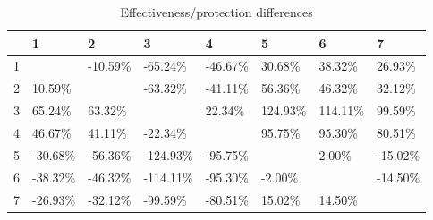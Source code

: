 \begin{table}[ht]
\centering
\begin{tabular}{rlllllll}
  \hline
 & 1 & 2 & 3 & 4 & 5 & 6 & 7 \\ 
  \hline
1 &  & -10.59\% & -65.24\% & -46.67\% & 30.68\% & 38.32\% & 26.93\% \\ 
  2 & 10.59\% &  & -63.32\% & -41.11\% & 56.36\% & 46.32\% & 32.12\% \\ 
  3 & 65.24\% & 63.32\% &  & 22.34\% & 124.93\% & 114.11\% & 99.59\% \\ 
  4 & 46.67\% & 41.11\% & -22.34\% &  & 95.75\% & 95.30\% & 80.51\% \\ 
  5 & -30.68\% & -56.36\% & -124.93\% & -95.75\% &  & 2.00\% & -15.02\% \\ 
  6 & -38.32\% & -46.32\% & -114.11\% & -95.30\% & -2.00\% &  & -14.50\% \\ 
  7 & -26.93\% & -32.12\% & -99.59\% & -80.51\% & 15.02\% & 14.50\% &  \\ 
   \hline
\end{tabular}
\caption{Effectiveness/protection differences} 
\end{table}
